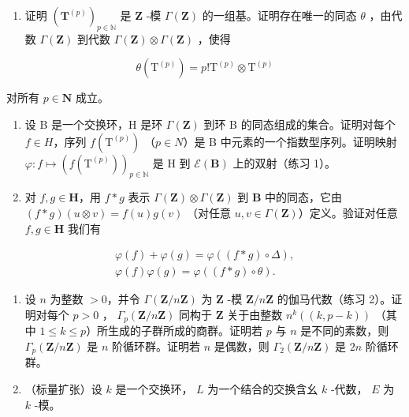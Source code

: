\begin{enumerate}
\def\labelenumi{\alph{enumi})}
\tightlist
\item
  证明 \((\mathbf{T}^{(p)})_{p\in \mathbb{N}}\) 是 \(\mathbf{Z}\) -模 \(\Gamma (\mathbf{Z})\) 的一组基。证明存在唯一的同态 \(\theta\) ，由代数 \(\Gamma (\mathbf{Z})\) 到代数 \(\Gamma (\mathbf{Z})\otimes \Gamma (\mathbf{Z})\) ，使得
\end{enumerate}

\[
\theta \left(\mathrm{T} ^ {(p)}\right) = p! \mathrm{T} ^ {(p)} \otimes \mathrm{T} ^ {(p)}
\]

对所有 \(p \in \mathbf{N}\) 成立。

\begin{enumerate}
\def\labelenumi{\alph{enumi})}
\setcounter{enumi}{1}
\item
  设 B 是一个交换环，H 是环 \(\Gamma(\mathbf{Z})\) 到环 B 的同态组成的集合。证明对每个 \(f \in H\)，序列 \(f(\mathrm{T}^{(p)})\) （\(p \in N\)）是 B 中元素的一个指数型序列。证明映射 \(\varphi: f \mapsto (f(\mathrm{T}^{(p)}))_{p \in \mathbb{N}}\) 是 H 到 \(\mathcal{E}(\mathbf{B})\) 上的双射（练习 1）。
\item
  对 \(f, g \in \mathbf{H}\)，用 \(f * g\) 表示 \(\Gamma(\mathbf{Z}) \otimes \Gamma(\mathbf{Z})\) 到 \(\mathbf{B}\) 中的同态，它由 \((f * g)(u \otimes v) = f(u)g(v)\) （对任意 \(u, v \in \Gamma(\mathbf{Z})\)）定义。验证对任意 \(f, g \in \mathbf{H}\) 我们有
\end{enumerate}

\[
\begin{array}{c} \varphi (f) + \varphi (g) = \varphi ((f * g) \circ \Delta), \\ \varphi (f) \varphi (g) = \varphi ((f * g) \circ \theta). \end{array}
\]

\begin{enumerate}
\def\labelenumi{\arabic{enumi})}
\setcounter{enumi}{5}
\item
  设 \(n\) 为整数 \(> 0\)，并令 \(\Gamma(\mathbf{Z}/n\mathbf{Z})\) 为 \(\mathbf{Z}\) -模 \(\mathbf{Z}/n\mathbf{Z}\) 的伽马代数（练习 2）。证明对每个 \(p > 0\) ， \(\Gamma_p(\mathbf{Z}/n\mathbf{Z})\) 同构于 \(\mathbf{Z}\) 关于由整数 \(n^k((k, p - k))\) （其中 \(1 \leqslant k \leqslant p\)）所生成的子群所成的商群。证明若 \(p\) 与 \(n\) 是不同的素数，则 \(\Gamma_p(\mathbf{Z}/n\mathbf{Z})\) 是 \(n\) 阶循环群。证明若 \(n\) 是偶数，则 \(\Gamma_2(\mathbf{Z}/n\mathbf{Z})\) 是 \(2n\) 阶循环群。
\item
  （标量扩张）设 \(k\) 是一个交换环， \(L\) 为一个结合的交换含幺 \(k\) -代数， \(E\) 为 \(k\) -模。
\end{enumerate}

